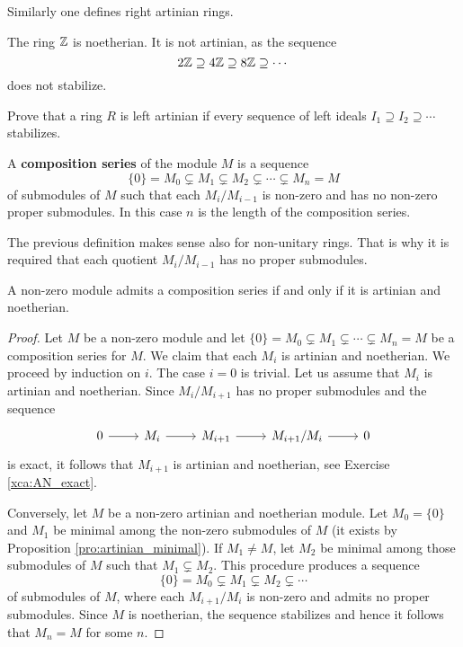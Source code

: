 Similarly one defines right artinian rings. 

\begin{example}
	The ring $\mathbb{Z}$ is noetherian. It is not artinian, as the sequence
	\[
	2\mathbb{Z}\supseteq
	4\mathbb{Z}\supseteq 8\mathbb{Z}\supseteq\cdots
	\]
	does not stabilize. 
\end{example}

\begin{exercise}
    Prove that a ring $R$ is left artinian if every sequence of 
    left ideals $I_1\supseteq I_2\supseteq\cdots$ stabilizes. 
\end{exercise}


\begin{definition}
	\label{def:serie_de_composicion}
	A \textbf{composition series} of the module $M$ is a sequence 
	\[
		\{0\}=M_0\subsetneq M_1\subsetneq M_2\subsetneq\cdots\subsetneq M_n=M
	\]
	of submodules of $M$ such that each $M_i/M_{i-1}$ is non-zero and has no non-zero 
	proper submodules. 
	In this case 
	$n$ is the length of the composition series.
\end{definition}

The previous definition makes sense also for non-unitary rings. That is why
it is required that each quotient $M_i/M_{i-1}$ has no proper submodules.

\begin{theorem}
	\label{thm:serie_de_composicion}
	A non-zero module admits a composition series if and only if it is artinian and noetherian.
\end{theorem}

\begin{proof}
	Let $M$ be a non-zero module and let $\{0\}=M_0\subsetneq
	M_1\subsetneq\cdots\subsetneq M_n=M$ be a composition series for $M$.
	We claim that each $M_i$ is artinian and noetherian. We proceed by induction on $i$. The case
	$i=0$ is trivial. Let us assume that $M_i$ is artinian and noetherian. Since 
	$M_i/M_{i+1}$ has no proper submodules and the sequence 
	\[
	\begin{tikzcd}
		0 \arrow{r}
		& M_i \arrow{r}
		& M_{i+1} \arrow{r}
		& M_{i+1}/M_i \arrow{r}
		& 0
	\end{tikzcd}
	\]
	is exact, it follows that 
	$M_{i+1}$ is artinian and noetherian, see Exercise \ref{xca:AN_exact}. 

    Conversely, let $M$ be a non-zero  artinian and noetherian module. Let $M_0=\{0\}$ and 
    $M_1$ be minimal among the non-zero  submodules of $M$ (it exists by Proposition \ref{pro:artinian_minimal}).
    If $M_1\ne M$, let 
	$M_2$ be minimal among those submodules of $M$ such that $M_1\subsetneq M_2$. This procedure
	produces a sequence 
	\[
		\{0\}=M_0\subsetneq M_1\subsetneq M_2\subsetneq\cdots
	\]
	of submodules of $M$, where each $M_{i+1}/M_i$ is non-zero and admits no
	proper submodules. Since $M$ is noetherian, the sequence stabilizes and
	hence it follows that $M_n=M$ for some $n$. 
\end{proof}

